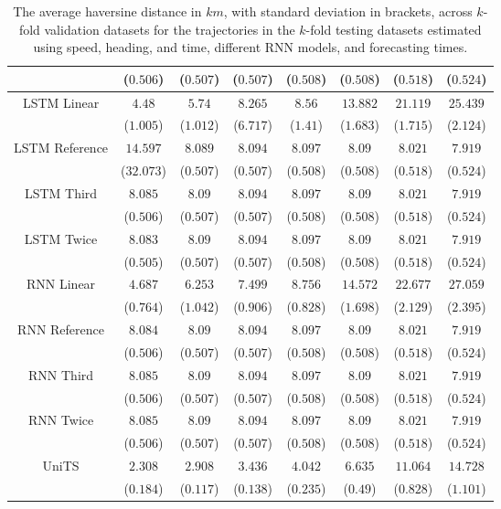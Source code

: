 \begin{table}[!ht]
{\begin{tabular}{|c|c|c|c|c|c|c|c|}
			 & ($0.506$) & ($0.507$) & ($0.507$) & ($0.508$) & ($0.508$) & ($0.518$) & ($0.524$) \\ \hline
			\multirow{2}{*}{LSTM Linear} & $4.48$ & $5.74$ & $8.265$ & $8.56$ & $13.882$ & $21.119$ & $25.439$ \\
			 & ($1.005$) & ($1.012$) & ($6.717$) & ($1.41$) & ($1.683$) & ($1.715$) & ($2.124$) \\ \hline
			\multirow{2}{*}{LSTM Reference} & $14.597$ & $8.089$ & $8.094$ & $8.097$ & $8.09$ & $8.021$ & $7.919$ \\
			 & ($32.073$) & ($0.507$) & ($0.507$) & ($0.508$) & ($0.508$) & ($0.518$) & ($0.524$) \\ \hline
			\multirow{2}{*}{LSTM Third} & $8.085$ & $8.09$ & $8.094$ & $8.097$ & $8.09$ & $8.021$ & $7.919$ \\
			 & ($0.506$) & ($0.507$) & ($0.507$) & ($0.508$) & ($0.508$) & ($0.518$) & ($0.524$) \\ \hline
			\multirow{2}{*}{LSTM Twice} & $8.083$ & $8.09$ & $8.094$ & $8.097$ & $8.09$ & $8.021$ & $7.919$ \\
			 & ($0.505$) & ($0.507$) & ($0.507$) & ($0.508$) & ($0.508$) & ($0.518$) & ($0.524$) \\ \hline
			\multirow{2}{*}{RNN Linear} & $4.687$ & $6.253$ & $7.499$ & $8.756$ & $14.572$ & $22.677$ & $27.059$ \\
			 & ($0.764$) & ($1.042$) & ($0.906$) & ($0.828$) & ($1.698$) & ($2.129$) & ($2.395$) \\ \hline
			\multirow{2}{*}{RNN Reference} & $8.084$ & $8.09$ & $8.094$ & $8.097$ & $8.09$ & $8.021$ & $7.919$ \\
			 & ($0.506$) & ($0.507$) & ($0.507$) & ($0.508$) & ($0.508$) & ($0.518$) & ($0.524$) \\ \hline
			\multirow{2}{*}{RNN Third} & $8.085$ & $8.09$ & $8.094$ & $8.097$ & $8.09$ & $8.021$ & $7.919$ \\
			 & ($0.506$) & ($0.507$) & ($0.507$) & ($0.508$) & ($0.508$) & ($0.518$) & ($0.524$) \\ \hline
			\multirow{2}{*}{RNN Twice} & $8.085$ & $8.09$ & $8.094$ & $8.097$ & $8.09$ & $8.021$ & $7.919$ \\
			 & ($0.506$) & ($0.507$) & ($0.507$) & ($0.508$) & ($0.508$) & ($0.518$) & ($0.524$) \\ \hline
			\multirow{2}{*}{UniTS} & $2.308$ & $2.908$ & $3.436$ & $4.042$ & $6.635$ & $11.064$ & $14.728$ \\
			 & ($0.184$) & ($0.117$) & ($0.138$) & ($0.235$) & ($0.49$) & ($0.828$) & ($1.101$) \\ \hline
		\end{tabular}
	}
	\caption{The average haversine distance in $km$, with standard deviation in brackets, across $k$-fold validation datasets for the trajectories in the $k$-fold testing datasets estimated using speed, heading, and time, different RNN models, and forecasting times.}
	\label{tab:all_speed_actual_dir_haversine}
\end{table}